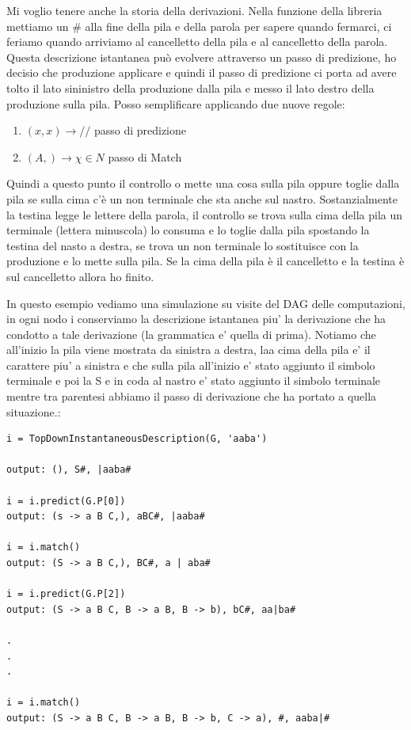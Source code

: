 Mi voglio tenere anche la storia della derivazioni. Nella funzione della libreria mettiamo un \# alla fine della pila e della parola per sapere quando fermarci, ci feriamo quando arriviamo al cancelletto della pila e al cancelletto della parola. Questa descrizione istantanea può evolvere attraverso un passo di predizione, ho decisio che produzione applicare e quindi il passo di predizione ci porta ad avere tolto il lato sininistro della produzione dalla pila e messo il lato destro della produzione sulla pila.
Posso semplificare applicando due nuove regole:
\begin{enumerate}
    \item $(x, x) \rightarrow //$ passo di predizione
    \item $(A, ) \rightarrow \chi \in N$ passo di Match
\end{enumerate}

Quindi a questo punto il controllo o mette una cosa sulla pila oppure toglie dalla pila se sulla cima c'è un non terminale che sta anche sul nastro. Sostanzialmente la testina legge le lettere della parola, il controllo se trova sulla cima della pila un terminale (lettera minuscola) lo consuma e lo toglie dalla pila spostando la testina del nasto a destra, se trova un non terminale lo sostituisce con la produzione e lo mette sulla pila. Se la cima della pila è il cancelletto e la testina è sul cancelletto allora ho finito.

In questo esempio vediamo una simulazione su visite del DAG delle computazioni, in ogni nodo i conserviamo la descrizione istantanea piu' la derivazione che ha condotto a tale derivazione (la grammatica e' quella di prima). Notiamo che all'inizio la pila viene mostrata da sinistra a destra, laa cima della pila e' il carattere piu' a sinistra e che sulla pila all'inizio e' stato aggiunto il simbolo terminale e poi la S e in coda al nastro e' stato aggiunto il simbolo terminale mentre tra parentesi abbiamo il passo di derivazione che ha portato a quella situazione.:
\begin{lstlisting}
i = TopDownInstantaneousDescription(G, 'aaba')

output: (), S#, |aaba#

i = i.predict(G.P[0])
output: (s -> a B C,), aBC#, |aaba#

i = i.match()
output: (S -> a B C,), BC#, a | aba#

i = i.predict(G.P[2])
output: (S -> a B C, B -> a B, B -> b), bC#, aa|ba#

.
.
.

i = i.match()
output: (S -> a B C, B -> a B, B -> b, C -> a), #, aaba|#
\end{lstlisting}

